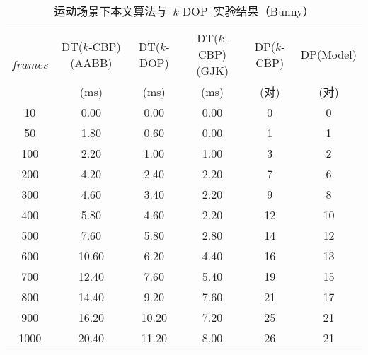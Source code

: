 \begin{table}[htbp]  
\centering
\caption{运动场景下本文算法与~$k$-DOP~实验结果（Bunny）}
\label{tab:exp:bunny:k24:kdop:kcbp:detail:dynamic}
\begin{tabular}{cccccc}
\toprule[1.5pt]
\multirow{2}{*}{$frames$} & DT($k$-CBP)(AABB) & DT($k$-DOP) & DT($k$-CBP)(GJK) & DP($k$-CBP) & DP(Model) \\
                         & (ms)              &  (ms)       & (ms)           & (对)&(对) \\
\midrule[1.0pt]
10 & 0.00  & 0.00  & 0.00  & 0 & 0\\
50 & 1.80  & 0.60  & 0.00  & 1 & 1\\
100 & 2.20  & 1.00  & 1.00  & 3 & 2\\
200 & 4.20  & 2.40  & 2.20  & 7 & 6\\
300 & 4.60  & 3.40  & 2.20  & 9 & 8\\
400 & 5.80  & 4.60  & 2.20  & 12 & 10\\
500 & 7.60  & 5.80  & 2.80  & 14 & 12\\
600 & 10.60  & 6.20  & 4.40  & 16 & 13\\
700 & 12.40  & 7.60  & 5.40  & 19 & 15\\
800 & 14.40  & 9.20  & 7.60  & 21 & 17\\
900 & 16.20  & 10.20  & 7.20  & 25 & 21\\
1000 & 20.40  & 11.20  & 8.00  & 26 & 21\\
\bottomrule[1.5pt]
\end{tabular}
\end{table}



